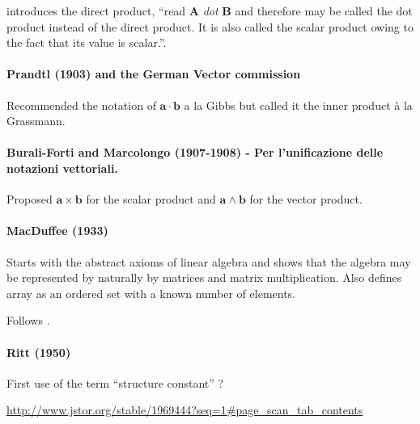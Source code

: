 \cite[p. 55]{Wilson1901} introduces the direct product, ``read \textbf{A} \textit{dot} \textbf{B} and therefore may be called the dot product instead of the direct product. It is also called the scalar product owing to the fact that its value is scalar.''.



\paragraph{Prandtl (1903) and the German Vector commission}

Recommended the notation of $\mathbf{a} \cdot \mathbf{b}$ a la Gibbs but called it the inner product à la Grassmann.

\paragraph{Burali-Forti and Marcolongo (1907-1908) - Per l’unificazione delle notazioni vettoriali.}

Proposed $\mathbf{a}\times\mathbf{b}$ for the scalar product and  $\mathbf{a}\wedge\mathbf{b}$ for the vector product.

\paragraph{MacDuffee (1933)~\cite{MacDuffee1933}}

Starts with the abstract axioms of linear algebra and shows that the algebra may be represented by naturally by matrices and matrix multiplication. Also defines array as an ordered set with a known number of elements.

Follows \cite{Scheffers1889}.

\paragraph{Ritt (1950)}

First use of the term ``structure constant'' ?

\url{http://www.jstor.org/stable/1969444?seq=1#page_scan_tab_contents}
